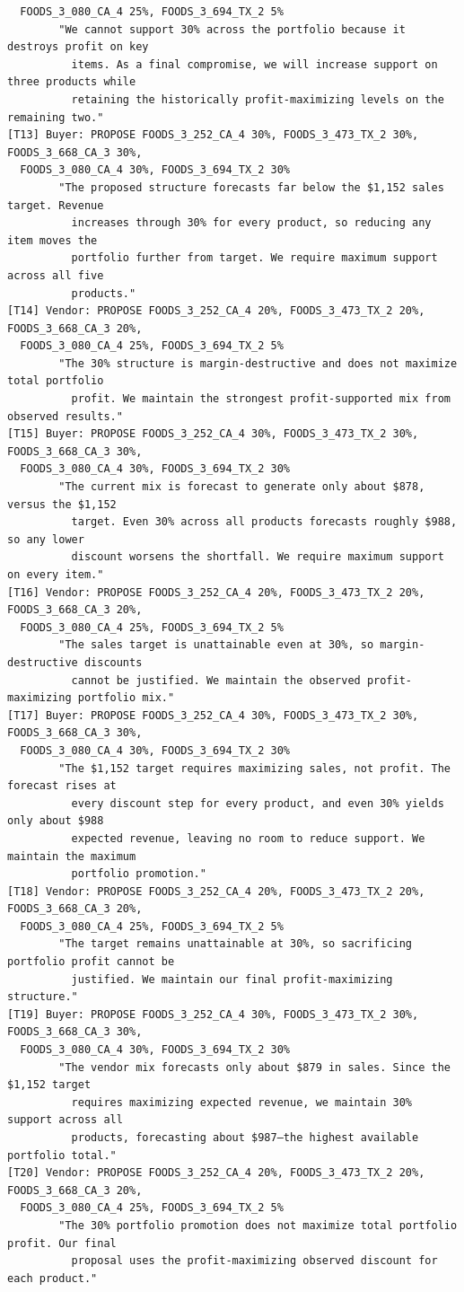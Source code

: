 {\begin{verbatim}
  FOODS_3_080_CA_4 25%, FOODS_3_694_TX_2 5%
        "We cannot support 30% across the portfolio because it destroys profit on key
          items. As a final compromise, we will increase support on three products while
          retaining the historically profit-maximizing levels on the remaining two."
[T13] Buyer: PROPOSE FOODS_3_252_CA_4 30%, FOODS_3_473_TX_2 30%, FOODS_3_668_CA_3 30%,
  FOODS_3_080_CA_4 30%, FOODS_3_694_TX_2 30%
        "The proposed structure forecasts far below the $1,152 sales target. Revenue
          increases through 30% for every product, so reducing any item moves the
          portfolio further from target. We require maximum support across all five
          products."
[T14] Vendor: PROPOSE FOODS_3_252_CA_4 20%, FOODS_3_473_TX_2 20%, FOODS_3_668_CA_3 20%,
  FOODS_3_080_CA_4 25%, FOODS_3_694_TX_2 5%
        "The 30% structure is margin-destructive and does not maximize total portfolio
          profit. We maintain the strongest profit-supported mix from observed results."
[T15] Buyer: PROPOSE FOODS_3_252_CA_4 30%, FOODS_3_473_TX_2 30%, FOODS_3_668_CA_3 30%,
  FOODS_3_080_CA_4 30%, FOODS_3_694_TX_2 30%
        "The current mix is forecast to generate only about $878, versus the $1,152
          target. Even 30% across all products forecasts roughly $988, so any lower
          discount worsens the shortfall. We require maximum support on every item."
[T16] Vendor: PROPOSE FOODS_3_252_CA_4 20%, FOODS_3_473_TX_2 20%, FOODS_3_668_CA_3 20%,
  FOODS_3_080_CA_4 25%, FOODS_3_694_TX_2 5%
        "The sales target is unattainable even at 30%, so margin-destructive discounts
          cannot be justified. We maintain the observed profit-maximizing portfolio mix."
[T17] Buyer: PROPOSE FOODS_3_252_CA_4 30%, FOODS_3_473_TX_2 30%, FOODS_3_668_CA_3 30%,
  FOODS_3_080_CA_4 30%, FOODS_3_694_TX_2 30%
        "The $1,152 target requires maximizing sales, not profit. The forecast rises at
          every discount step for every product, and even 30% yields only about $988
          expected revenue, leaving no room to reduce support. We maintain the maximum
          portfolio promotion."
[T18] Vendor: PROPOSE FOODS_3_252_CA_4 20%, FOODS_3_473_TX_2 20%, FOODS_3_668_CA_3 20%,
  FOODS_3_080_CA_4 25%, FOODS_3_694_TX_2 5%
        "The target remains unattainable at 30%, so sacrificing portfolio profit cannot be
          justified. We maintain our final profit-maximizing structure."
[T19] Buyer: PROPOSE FOODS_3_252_CA_4 30%, FOODS_3_473_TX_2 30%, FOODS_3_668_CA_3 30%,
  FOODS_3_080_CA_4 30%, FOODS_3_694_TX_2 30%
        "The vendor mix forecasts only about $879 in sales. Since the $1,152 target
          requires maximizing expected revenue, we maintain 30% support across all
          products, forecasting about $987—the highest available portfolio total."
[T20] Vendor: PROPOSE FOODS_3_252_CA_4 20%, FOODS_3_473_TX_2 20%, FOODS_3_668_CA_3 20%,
  FOODS_3_080_CA_4 25%, FOODS_3_694_TX_2 5%
        "The 30% portfolio promotion does not maximize total portfolio profit. Our final
          proposal uses the profit-maximizing observed discount for each product."
\end{verbatim}
}

